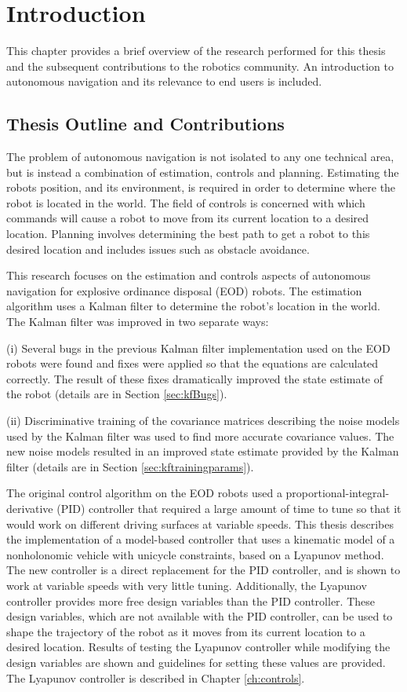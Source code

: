 \chapter{Introduction}
\label{ch:introduction}
This chapter provides a brief overview of the research performed for this thesis and the subsequent contributions to the robotics community. An introduction to autonomous navigation and its relevance to end users is included.

\section{Thesis Outline and Contributions}
\label{sec:outline}
The problem of autonomous navigation is not isolated to any one technical area, but is instead a combination of estimation, controls and planning. Estimating the robots position, and its environment, is required in order to determine where the robot is located in the world. The field of controls is concerned with which commands will cause a robot to move from its current location to a desired location. Planning involves determining the best path to get a robot to this desired location and includes issues such as obstacle avoidance.

This research focuses on the estimation and controls aspects of autonomous navigation for explosive ordinance disposal (EOD) robots. The estimation algorithm uses a Kalman filter to determine the robot's location in the world. The Kalman filter was improved in two separate ways:

(i) Several bugs in the previous Kalman filter implementation used on the EOD robots were found and fixes were applied so that the equations are calculated correctly. The result of these fixes dramatically improved the state estimate of the robot (details are in Section \ref{sec:kfBugs}).

(ii) Discriminative training of the covariance matrices describing the noise models used by the Kalman filter was used to find more accurate covariance values. The new noise models resulted in an improved state estimate provided by the Kalman filter (details are in Section \ref{sec:kftrainingparams}).

The original control algorithm on the EOD robots used a proportional-integral-derivative (PID) controller that required a large amount of time to tune so that it would work on different driving surfaces at variable speeds. This thesis describes the implementation of a model-based controller that uses a kinematic model of a nonholonomic vehicle with unicycle constraints, based on a Lyapunov method. The new controller is a direct replacement for the PID controller, and is shown to work at variable speeds with very little tuning. Additionally, the Lyapunov controller provides more free design variables than the PID controller. These design variables, which are not available with the PID controller, can be used to shape the trajectory of the robot as it moves from its current location to a desired location. Results of testing the Lyapunov controller while modifying the design variables are shown and guidelines for setting these values are provided. The Lyapunov controller is described in Chapter \ref{ch:controls}.

